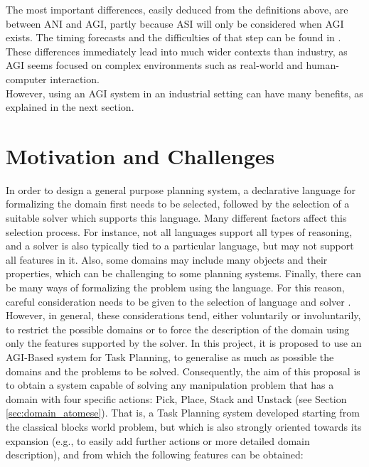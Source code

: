 The most important differences, easily deduced from the definitions above, are between ANI and AGI, partly because ASI will only be considered when AGI exists. 
The timing forecasts and the difficulties of that step can be found in \cite{995_experts_opinions}. \\
These differences immediately lead into much wider contexts than industry, as AGI seems focused on complex environments such as real-world and human-computer interaction. \\
However, using an AGI system in an industrial setting can have many benefits, as explained in the next section.


\section{Motivation and Challenges}\label{sec:motivation}

In order to design a general purpose planning system, a declarative language for formalizing the domain first needs to be selected, followed by the selection of a suitable solver which supports this language. Many different factors affect this selection process.
For instance, not all languages support all types of reasoning, and a solver is also typically tied to a particular language, but may not support all features in it. Also, some domains may include many objects and their properties, which can be challenging to some planning systems. Finally, there can be many ways of formalizing the problem using the language.
For this reason, careful consideration needs to be given to the selection of language and solver \cite{DBLP:journals/corr/abs-1804-08229}.
However, in general, these considerations tend, either voluntarily or involuntarily, to restrict the possible domains or to force the description of the domain using only the features supported by the solver.
In this project, it is proposed to use an AGI-Based system for Task Planning, to generalise as much as possible the domains and the problems to be solved.
Consequently, the aim of this proposal is to obtain a system capable of solving any manipulation problem that has a domain with four specific actions: Pick, Place, Stack and Unstack (see Section \ref{sec:domain_atomese}).  
That is, a Task Planning system developed starting from the classical blocks world problem, but which is also strongly oriented towards its expansion (e.g., to easily add further actions or more detailed domain description), and from which the following features can be obtained:

